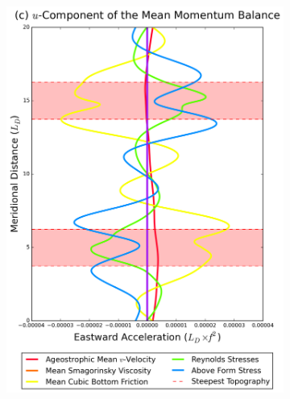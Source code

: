 \documentclass[12pt,a4paper]{report}
\begin{document}
\begin{figure}
\begin{subfigure}{0.46\linewidth}
 		\includegraphics[width=\linewidth ]{umom_1}
 		\label{fig:umomlayer1}
 	\end{subfigure}
 	\quad
 	\begin{subfigure}{0.46\linewidth}
 		\centering

\end{subfigure}
\end{figure}
\end{document}

